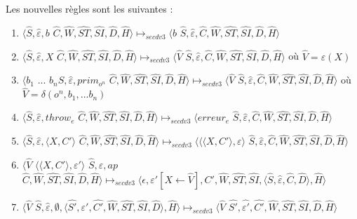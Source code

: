 \documentclass[10pt,a4paper]{article}
\begin{document}
				Les nouvelles règles sont les suivantes :
				\smallbreak
				\begin{enumerate}
					\item $\langle\widehat{S},\widehat{\varepsilon},b$ $\widehat{C},\widehat{W},\widehat{ST},\widehat{SI},\widehat{D},\widehat{H}\rangle \longmapsto_{secdv3} \langle b$ $\widehat{S},\widehat{\varepsilon},\widehat{C},\widehat{W},\widehat{ST},\widehat{SI},\widehat{D},\widehat{H}\rangle$
					\item $\langle\widehat{S},\widehat{\varepsilon},X$ $\widehat{C},\widehat{W},\widehat{ST},\widehat{SI},\widehat{D},\widehat{H}\rangle \longmapsto_{secdv3} \langle \widehat{V}$ $\widehat{S},\widehat{\varepsilon},\widehat{C},\widehat{W},\widehat{ST},\widehat{SI},\widehat{D},\widehat{H}\rangle$ où $\widehat{V} = \varepsilon(X)$
					\item $\langle b_{1}$ $...$ $b_{n}\widehat{S},\widehat{\varepsilon},prim_{o^{n}}$ $\widehat{C},\widehat{W},\widehat{ST},\widehat{SI},\widehat{D},\widehat{H}\rangle \longmapsto_{secdv3} \langle \widehat{V}$ $\widehat{S},\widehat{\varepsilon},\widehat{C},\widehat{W},\widehat{ST},\widehat{SI},\widehat{D},\widehat{H}\rangle$ où $\widehat{V} = \delta(o^{n},b_1,...b_{n})$
					\item $\langle\widehat{S},\widehat{\varepsilon},throw_{e}$ $\widehat{C},\widehat{W},\widehat{ST},\widehat{SI},\widehat{D},\widehat{H}\rangle \longmapsto_{secdv3} \langle erreur_{e}$ $\widehat{S},\widehat{\varepsilon},\widehat{C},\widehat{W},\widehat{ST},\widehat{SI},\widehat{D},\widehat{H}\rangle$
					\item $\langle\widehat{S},\widehat{\varepsilon},\langle X,C'\rangle$ $\widehat{C},\widehat{W},\widehat{ST},\widehat{SI},\widehat{D},\widehat{H}\rangle \longmapsto_{secdv3} \langle\langle\langle X,C'\rangle,\varepsilon\rangle$ $\widehat{S},\widehat{\varepsilon},\widehat{C},\widehat{W},\widehat{ST},\widehat{SI},\widehat{D},\widehat{H}\rangle$
					\item $\langle\widehat{V}$ $\langle\langle X,C'\rangle,\varepsilon'\rangle$ $\widehat{S},\widehat{\varepsilon},ap$ $\widehat{C},\widehat{W},\widehat{ST},\widehat{SI},\widehat{D},\widehat{H}\rangle \longmapsto_{secdv3} \langle\epsilon,\varepsilon'[X \leftarrow \widehat{V}],C',\widehat{W},\widehat{ST},\widehat{SI},\langle\widehat{S},\widehat{\varepsilon},\widehat{C},\widehat{D}\rangle,\widehat{H}\rangle$
					\item $\langle\widehat{V}$ $\widehat{S},\widehat{\varepsilon},\emptyset,\langle\widehat{S'},\widehat{\varepsilon'},\widehat{C'},\widehat{W},\widehat{ST},\widehat{SI},\widehat{D}\rangle,\widehat{H}\rangle \longmapsto_{secdv3} \langle \widehat{V}$ $\widehat{S'},\widehat{\varepsilon'},\widehat{C'},\widehat{W},\widehat{ST},\widehat{SI},\widehat{D},\widehat{H}\rangle$

\end{enumerate}
\end{document}
